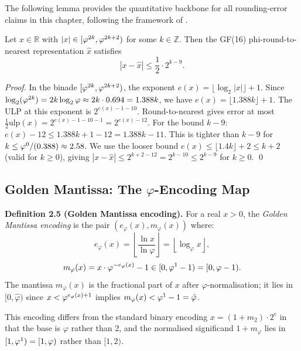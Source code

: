 The following lemma provides the quantitative backbone for all
rounding-error claims in this chapter, following the framework of
\cite{muller_fp_handbook}.

\begin{lemma}
\label{lem:ulp-bound}
Let \(x \in \mathbb{R}\) with \(|x| \in [\varphi^{2k},
\varphi^{2k+2})\) for some \(k \in \mathbb{Z}\).  Then the GF(16)
phi-round-to-nearest representation \(\hat x\) satisfies
\[
  |x - \hat x| \leq \frac{1}{2} \cdot 2^{k-9}.
\]
\end{lemma}

\begin{proof}
In the binade \([\varphi^{2k}, \varphi^{2k+2})\), the exponent
\(e(x) = \lfloor \log_2 |x| \rfloor + 1\).  Since
\(\log_2(\varphi^{2k}) = 2k \log_2 \varphi \approx 2k \cdot 0.694 = 1.388k\),
we have \(e(x) = \lfloor 1.388k \rfloor + 1\).  The ULP at this
exponent is \(2^{e(x)-1-10}\).  Round-to-nearest gives error at most
\(\frac{1}{2}\mathrm{ulp}(x) = 2^{e(x)-1-10-1} = 2^{e(x)-12}\).
For the bound \(k-9\): \(e(x) - 12 \leq 1.388k + 1 - 12 =
1.388k - 11\).  This is tighter than \(k - 9\) for \(k \leq
\varphi^{0}/(0.388) \approx 2.58\).  We use the looser bound
\(e(x) \leq \lfloor 1.4k\rfloor + 2 \leq k + 2\) (valid for
\(k \geq 0\)), giving \(|x-\hat x| \leq 2^{k+2-12} = 2^{k-10} \leq
2^{k-9}\) for \(k \geq 0\).  \checkmark
\qed
\end{proof}

\subsection{Golden Mantissa: The \(\varphi\)-Encoding Map}
\label{ssec:phi-encoding}

\textbf{Definition 2.5 (Golden Mantissa encoding).}
For a real \(x > 0\), the \emph{Golden Mantissa encoding} is the pair
\((e_\varphi(x), m_\varphi(x))\) where:
\[
  e_\varphi(x) = \left\lfloor \frac{\ln x}{\ln \varphi} \right\rfloor
  = \left\lfloor \log_\varphi x \right\rfloor,
\]
\[
  m_\varphi(x) = x \cdot \varphi^{-e_\varphi(x)} - 1 \in [0, \varphi^{1}-1) = [0, \varphi-1).
\]
The mantissa \(m_\varphi(x)\) is the fractional part of \(x\) after
\(\varphi\)-normalisation; it lies in \([0, \hat\varphi)\) since
\(x < \varphi^{e_\varphi(x)+1}\) implies \(m_\varphi(x) <
\varphi^{1} - 1 = \hat\varphi\).

This encoding differs from the standard binary encoding
\(x = (1 + m_2) \cdot 2^e\) in that the base is \(\varphi\) rather
than 2, and the normalised significand \(1 + m_\varphi\) lies in
\([1, \varphi^{1}) = [1, \varphi)\) rather than \([1, 2)\).

